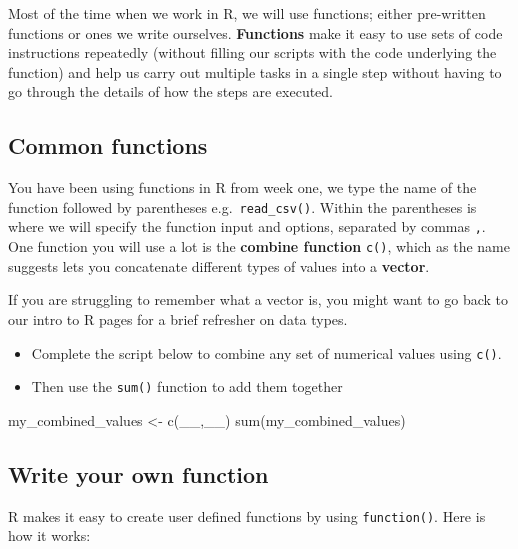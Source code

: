 \documentclass[
]{book}
\makeatletter
\newenvironment{Shaded}{\begin{snugshade}}{\end{snugshade}}
\newcommand{\FunctionTok}[1]{\textcolor[rgb]{0.00,0.00,0.00}{#1}}
\newcommand{\NormalTok}[1]{#1}
\newcommand{\OtherTok}[1]{\textcolor[rgb]{0.56,0.35,0.01}{#1}}
\newenvironment{kframe}{%
\medskip{}
\setlength{\fboxsep}{.8em}
 \def\at@end@of@kframe{}%
 \ifinner\ifhmode%
  \def\at@end@of@kframe{\end{minipage}}%
  \begin{minipage}{\columnwidth}%
 \fi\fi%
 \def\FrameCommand##1{\hskip\@totalleftmargin \hskip-\fboxsep
 \colorbox{shadecolor}{##1}\hskip-\fboxsep
     \hskip-\linewidth \hskip-\@totalleftmargin \hskip\columnwidth}%
 \MakeFramed {\advance\hsize-\width
   \@totalleftmargin\z@ \linewidth\hsize
   \@setminipage}}%
 {\par\unskip\endMakeFramed%
 \at@end@of@kframe}
\newenvironment{block}[1]
  {
  \begin{itemize}
  \renewcommand{\labelitemi}{
    \raisebox{-.7\height}[0pt][0pt]{
      {\setkeys{Gin}{width=3em,keepaspectratio}\texttt{[image: images/\#1]}}
    }
  }
  \setlength{\fboxsep}{1em}
  \begin{kframe}
  \item
  }
  {
  \end{kframe}
  \end{itemize}
  }
\newenvironment{rmdnote}
  {\begin{block}{note}}
  {\end{block}}
\makeatother
\begin{document}
Most of the time when we work in R, we will use functions; either pre-written functions or ones we write ourselves. \textbf{Functions} make it easy to use sets of code instructions repeatedly (without filling our scripts with the code underlying the function) and help us carry out multiple tasks in a single step without having to go through the details of how the steps are executed.

\hypertarget{common-functions}{%
\subsection{Common functions}\label{common-functions}}

You have been using functions in R from week one, we type the name of the function followed by parentheses e.g.~\texttt{read\_csv()}. Within the parentheses is where we will specify the function input and options, separated by commas \texttt{,}. One function you will use a lot is the \textbf{combine function} \texttt{c()}, which as the name suggests lets you concatenate different types of values into a \textbf{vector}.

\begin{rmdnote}
If you are struggling to remember what a vector is, you might want to go
back to our intro to R pages for a brief refresher on data types.
\end{rmdnote}

\begin{itemize}
\item
  Complete the script below to combine any set of numerical values using \texttt{c()}.
\item
  Then use the \texttt{sum()} function to add them together
\end{itemize}

\begin{Shaded}
\begin{Highlighting}[]
\NormalTok{my\_combined\_values }\OtherTok{\textless{}{-}} \FunctionTok{c}\NormalTok{(\_\_,\_\_) }
\FunctionTok{sum}\NormalTok{(my\_combined\_values)}
\end{Highlighting}
\end{Shaded}

\hypertarget{write-your-own-function}{%
\subsection{Write your own function}\label{write-your-own-function}}

R makes it easy to create user defined functions by using \texttt{function()}. Here is how it works:
\end{document}
